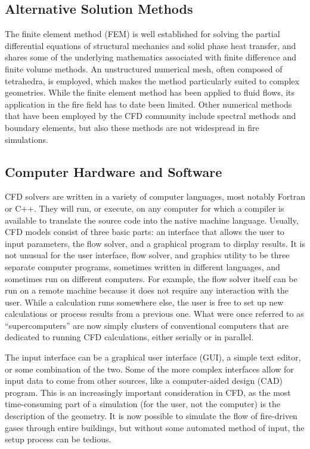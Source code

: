 \documentclass[graybox]{svmult}
\begin{document}
\subsection{Alternative Solution Methods}

The finite element method (FEM) is well established for solving the partial differential equations of structural mechanics and solid phase heat transfer, and shares some of the underlying mathematics associated with finite difference and finite volume methods. An unstructured numerical mesh, often composed of tetrahedra, is employed, which makes the method particularly suited to complex geometries. While the finite element method has been applied to fluid flows, its application in the fire field has to date been limited. Other numerical methods that have been employed by the CFD community include spectral methods and boundary elements, but also these methods are not widespread in fire simulations.



\subsection{Computer Hardware and Software}

CFD solvers are written in a variety of computer languages, most notably Fortran or C++. They will run, or execute, on any computer for which a compiler is available to translate the source code into the native machine language. Usually, CFD models consist of three basic parts: an interface that allows the user to input parameters, the flow solver, and a graphical program to display results. It is not unusual for the user interface, flow solver, and graphics utility to be three separate computer programs, sometimes written in different languages, and sometimes run on different computers. For example, the flow solver itself can be run on a remote machine because it does not require any interaction with the user. While a calculation runs somewhere else, the user is free to set up new calculations or process results from a previous one. What were once referred to as ``supercomputers'' are now simply clusters of conventional computers that are dedicated to running CFD calculations, either serially or in parallel.

The input interface can be a graphical user interface (GUI), a simple text editor, or some combination of the two. Some of the more complex interfaces allow for input data to come from other sources, like a computer-aided design (CAD) program. This is an increasingly important consideration in CFD, as the most time-consuming part of a simulation (for the user, not the computer) is the description of the geometry. It is now possible to simulate the flow of fire-driven gases through entire buildings, but without some automated method of input, the setup process can be tedious.
\end{document}
